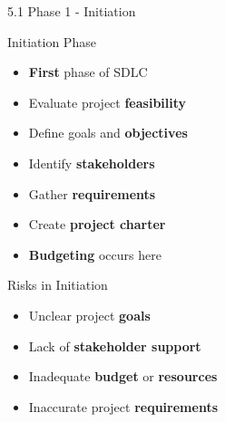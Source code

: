 \documentclass{beamer}
\begin{document}
	\begin{frame}{5.1 Phase 1 - Initiation}
		\begin{block}{Initiation Phase}
			\begin{itemize}
				\item \textbf{First} phase of SDLC
				\item Evaluate project \textbf{feasibility}
				\item Define goals and \textbf{objectives}
				\item Identify \textbf{stakeholders}
				\item Gather \textbf{requirements}
				\item Create \textbf{project charter}
				\item \textbf{Budgeting} occurs here
			\end{itemize}
		\end{block}
		
		\begin{block}{Risks in Initiation}
			\begin{itemize}
				\item Unclear project \textbf{goals}
				\item Lack of \textbf{stakeholder support}
				\item Inadequate \textbf{budget} or \textbf{resources}
				\item Inaccurate project \textbf{requirements}
			\end{itemize}
		\end{block}
	\end{frame}
	
\end{document}

